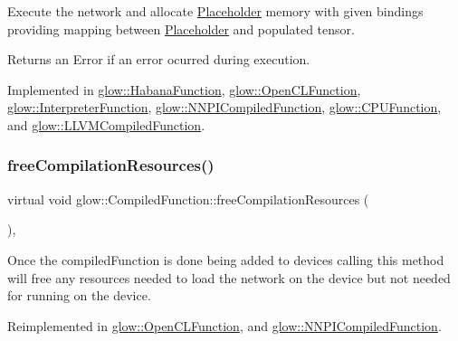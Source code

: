 Execute the network and allocate \hyperlink{classglow_1_1_placeholder}{Placeholder} memory with given {\ttfamily bindings} providing mapping between \hyperlink{classglow_1_1_placeholder}{Placeholder} and populated tensor. \begin{DoxyReturn}{Returns}
an Error if an error ocurred during execution. 
\end{DoxyReturn}


Implemented in \hyperlink{classglow_1_1_habana_function_ad3984e53ddb4615368e53acdc2418890}{glow\+::\+Habana\+Function}, \hyperlink{classglow_1_1_open_c_l_function_aa203e8d612943a37fcd5c44285a6c6eb}{glow\+::\+Open\+C\+L\+Function}, \hyperlink{classglow_1_1_interpreter_function_a6bc0763da64f449b7fda842397fc7c86}{glow\+::\+Interpreter\+Function}, \hyperlink{classglow_1_1_n_n_p_i_compiled_function_a60c241e9e44d70fe5486c44f5cddb7e6}{glow\+::\+N\+N\+P\+I\+Compiled\+Function}, \hyperlink{classglow_1_1_c_p_u_function_a31625d840ca33030c6762955c93d82a1}{glow\+::\+C\+P\+U\+Function}, and \hyperlink{classglow_1_1_l_l_v_m_compiled_function_a5589e30446aa3a92f3e94267bded99ae}{glow\+::\+L\+L\+V\+M\+Compiled\+Function}.

\mbox{\label{classglow_1_1_compiled_function_a0bd30fa8ff4f317ac14ae1c02898ed1a}} 
\subsubsection{\texorpdfstring{free\+Compilation\+Resources()}{freeCompilationResources()}}
{\footnotesize\ttfamily virtual void glow\+::\+Compiled\+Function\+::free\+Compilation\+Resources (\begin{DoxyParamCaption}{ }\end{DoxyParamCaption})\hspace{0.3cm}{\ttfamily [inline]}, {\ttfamily [virtual]}}

Once the compiled\+Function is done being added to devices calling this method will free any resources needed to load the network on the device but not needed for running on the device. 

Reimplemented in \hyperlink{classglow_1_1_open_c_l_function_aeaa9afb43d01cedc7c89c7451e5cec5d}{glow\+::\+Open\+C\+L\+Function}, and \hyperlink{classglow_1_1_n_n_p_i_compiled_function_aa1e428414a8a7183835f9293903682fb}{glow\+::\+N\+N\+P\+I\+Compiled\+Function}.

